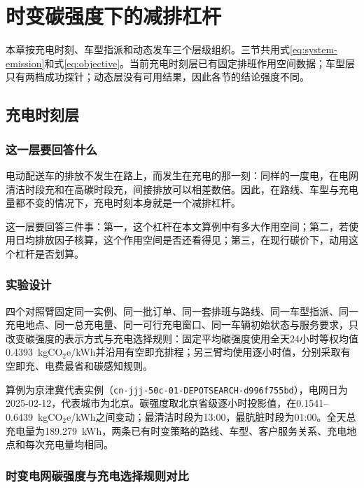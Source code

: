 \documentclass{setp-new}
\begin{document}
\section{时变碳强度下的减排杠杆}

本章按充电时刻、车型指派和动态发车三个层级组织。三节共用式\eqref{eq:system-emission}和式\eqref{eq:objective}。当前充电时刻层已有固定排班作用空间数据；车型层只有两档成功探针；动态层没有可用结果，因此各节的结论强度不同。

\subsection{充电时刻层}

\subsubsection{这一层要回答什么}

电动配送车的排放不发生在路上，而发生在充电的那一刻：同样的一度电，在电网清洁时段充和在高碳时段充，间接排放可以相差数倍。因此，在路线、车型与充电量都不变的情况下，充电时刻本身就是一个减排杠杆。

这一层要回答三件事：第一，这个杠杆在本文算例中有多大作用空间；第二，若使用日均排放因子核算，这个作用空间是否还看得见；第三，在现行碳价下，动用这个杠杆是否划算。

\subsubsection{实验设计}

四个对照臂固定同一实例、同一批订单、同一套排班与路线、同一车型指派、同一充电地点、同一总充电量、同一可行充电窗口、同一车辆初始状态与服务要求，只改变碳强度的表示方式与充电选择规则：固定平均碳强度使用全天24小时等权均值0.4393~kgCO$_2$e/kWh并沿用有空即充排程；另三臂均使用逐小时值，分别采取有空即充、电费最省和碳感知规则。

算例为京津冀代表实例（\texttt{cn-jjj-50c-01-DEPOTSEARCH-d996f755bd}），电网日为2025-02-12，代表城市为北京。碳强度取北京省级逐小时投影值，在0.1541--0.6439~kgCO$_2$e/kWh之间变动；最清洁时段为13:00，最肮脏时段为01:00。全天总充电量为189.279~kWh，两条已有时变策略的路线、车型、客户服务关系、充电地点和每次充电量均相同。

\subsubsection{时变电网碳强度与充电选择规则对比}
\end{document}
